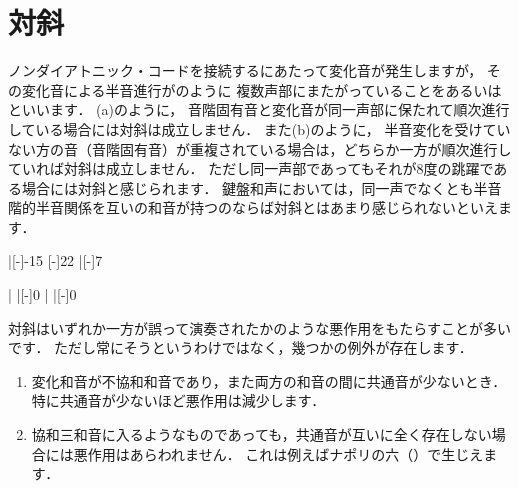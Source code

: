 \documentclass[dvipdfmx,uplatex,b5paper,openany,jbase=12Q,nomag*,textwidth-limit=44%
               ]{gachimuchi}
\begin{document}
\section{対斜}
ノンダイアトニック・コードを接続するにあたって変化音が発生しますが，
その変化音による半音進行がのように
複数声部にまたがっていることをあるいはといいます．
(a)のように，
音階固有音と変化音が同一声部に保たれて順次進行している場合には対斜は成立しません．
また(b)のように，
半音変化を受けていない方の音（音階固有音）が重複されている場合は，どちらか一方が順次進行していれば対斜は成立しません．
ただし同一声部であってもそれが8度の跳躍である場合には対斜と感じられます．
鍵盤和声においては，同一声でなくとも半音階的半音関係を互いの和音が持つのならば対斜とはあまり感じられないといえます．

\begin{Music}
  \Startpiece%
  \Notes%
  |[-\QNwidth]{-15}%
  \en\doublebar%
  \Notes%
  [-\QNwidth]{22}%
  |[-\QNwidth]{7}%
  \en\setdoublebar%
  \endpiece%
\end{Music}
\begin{Music}
  \Startpiece%
  \znotes|\en
  \Notes%
  |[-\QNwidth]{0}%
  \en\doublebar%
  \znotes|\en
  \Notes%
  |[-\QNwidth]{0}%
  \en\setdoublebar%
  \endpiece%
\end{Music}

対斜はいずれか一方が誤って演奏されたかのような悪作用をもたらすことが多いです．
ただし常にそうというわけではなく，幾つかの例外が存在します．
\begin{enumerate}
  \item 変化和音が不協和和音であり，また両方の和音の間に共通音が少ないとき．
        特に共通音が少ないほど悪作用は減少します．
  \item 協和三和音に入るようなものであっても，共通音が互いに全く存在しない場合には悪作用はあらわれません．
        これは例えばナポリの六（）で生じえます．
\end{enumerate}
\end{document}
